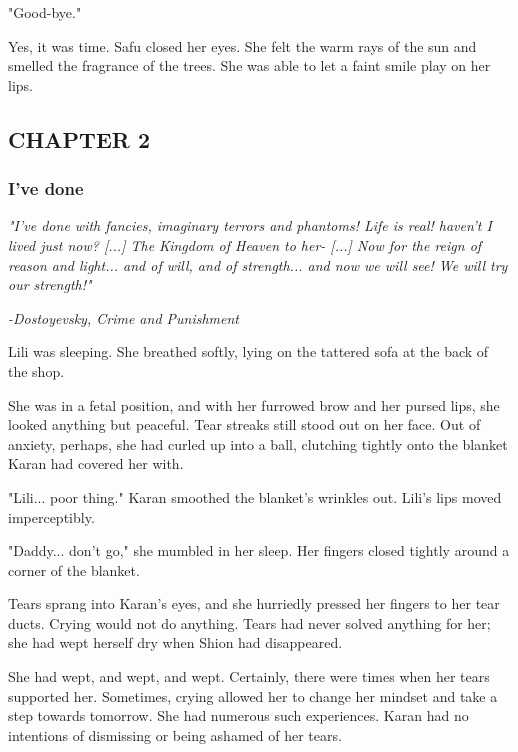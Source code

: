 "Good-bye."

Yes, it was time. Safu closed her eyes. She felt the warm rays of the
sun and smelled the fragrance of the trees. She was able to let a faint
smile play on her lips.

\hypertarget{index_split_002_split_002.htmlux5cux23calibre_pb_37}{}

\protect\hypertarget{index_split_037.html}{}{}

\hypertarget{index_split_037.htmlux5cux23calibre_pb_0}{}

\hypertarget{index_split_037.htmlux5cux23calibre_toc_3}{%
\subsection{CHAPTER 2}\label{index_split_037.htmlux5cux23calibre_toc_3}}

\subsubsection{I've done}

\emph{"I've done with fancies, imaginary terrors and phantoms! Life is
real! haven't I lived just now? {[}...{]} The Kingdom of Heaven to her-
{[}...{]} Now for the reign of reason and light... and of will, and of
strength... and now we will see! We will try our strength!"}

\emph{-Dostoyevsky, Crime and Punishment}

Lili was sleeping. She breathed softly, lying on the tattered sofa at
the back of the shop.

She was in a fetal position, and with her furrowed brow and her pursed
lips, she looked anything but peaceful. Tear streaks still stood out on
her face. Out of anxiety, perhaps, she had curled up into a ball,
clutching tightly onto the blanket Karan had covered her with.

"Lili... poor thing." Karan smoothed the blanket's wrinkles out. Lili's
lips moved imperceptibly.

"Daddy... don't go," she mumbled in her sleep. Her fingers closed
tightly around a corner of the blanket.

Tears sprang into Karan's eyes, and she hurriedly pressed her fingers to
her tear ducts. Crying would not do anything. Tears had never solved
anything for her; she had wept herself dry when Shion had disappeared.

She had wept, and wept, and wept. Certainly, there were times when her
tears supported her. Sometimes, crying allowed her to change her mindset
and take a step towards tomorrow. She had numerous such experiences.
Karan had no intentions of dismissing or being ashamed of her tears.

